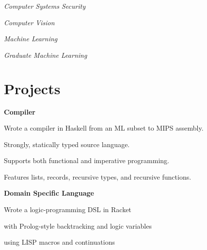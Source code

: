\documentclass[margin,line]{resume}
\begin{document}
\begin{resume}
    \textsl{Computer Systems Security} \par\vspace{-4mm}%
    {\addtolength{\leftskip}{2 mm} 
    \par}
    
        \textsl{Computer Vision} \par\vspace{-4mm}%
    {\addtolength{\leftskip}{2 mm}  
    \par}
    
        \textsl{Machine Learning} \par\vspace{-4mm}%
    {\addtolength{\leftskip}{2 mm}       
    \par}
   
       \textsl{Graduate Machine Learning} \par\vspace{-1mm}%
    {\addtolength{\leftskip}{2 mm}       
    \par}
    \section{\mysidestyle{} Projects}

    \textbf{Compiler}    \par\vspace{-4.0mm}%
      {\addtolength{\leftskip}{2 mm}
 Wrote a compiler in Haskell from an ML subset to MIPS assembly. 
 \begin{list2}
  \item Strongly, statically typed source language.
  \item Supports both functional and imperative programming.
  \item Features lists, records, recursive types, and recursive functions. 
 \end{list2}
      \par}

    \textbf{Domain Specific Language}  \par\vspace{-4.0mm}%
      {\addtolength{\leftskip}{2 mm}
      Wrote a logic-programming DSL in Racket
       \begin{list2}
  \item with Prolog-style backtracking and logic variables
  \item using LISP macros and continuations
 \end{list2}
      \par}      


\end{resume}
\end{document}
